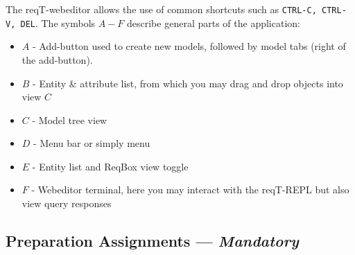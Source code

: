 \documentclass[11pt]{article}
\begin{document}
The reqT-webeditor allows the use of common shortcuts such as \texttt{CTRL-C, CTRL-V, DEL}. The symbols $A-F$ describe general parts of the application:

\begin{itemize}
\item $A$ - Add-button used to create new models, followed by model tabs (right of the add-button).
\item $B$ - Entity \& attribute list, from which you may drag and drop objects into view $C$
\item $C$ - Model tree view
\item $D$ - Menu bar or simply menu
\item $E$ - Entity list and ReqBox view toggle
\item $F$ - Webeditor terminal, here you may interact with the reqT-REPL but also view query responses
\end{itemize}

\subsection{Preparation Assignments --- \textit{Mandatory}}
\end{document}
